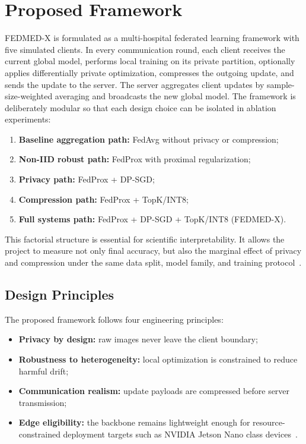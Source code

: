 \section{Proposed Framework}
FEDMED-X is formulated as a multi-hospital federated learning framework with
five simulated clients. In every communication round, each client receives
the current global model, performs local training on its private partition,
optionally applies differentially private optimization, compresses the
outgoing update, and sends the update to the server. The server aggregates
client updates by sample-size-weighted averaging and broadcasts the new
global model. The framework is deliberately modular so that each design
choice can be isolated in ablation experiments:
\begin{enumerate}[leftmargin=*]
  \item \textbf{Baseline aggregation path:} FedAvg without privacy or
        compression;
  \item \textbf{Non-IID robust path:} FedProx with proximal regularization;
  \item \textbf{Privacy path:} FedProx + DP-SGD;
  \item \textbf{Compression path:} FedProx + TopK/INT8;
  \item \textbf{Full systems path:} FedProx + DP-SGD + TopK/INT8 (FEDMED-X).
\end{enumerate}
This factorial structure is essential for scientific interpretability. It
allows the project to measure not only final accuracy, but also the marginal
effect of privacy and compression under the same data split, model family,
and training protocol~\cite{zhou2025federated}.

\subsection{Design Principles}
The proposed framework follows four engineering principles:
\begin{itemize}[leftmargin=*]
  \item \textbf{Privacy by design:} raw images never leave the client
        boundary;
  \item \textbf{Robustness to heterogeneity:} local optimization is
        constrained to reduce harmful drift;
  \item \textbf{Communication realism:} update payloads are compressed
        before server transmission;
  \item \textbf{Edge eligibility:} the backbone remains lightweight enough
        for resource-constrained deployment targets such as NVIDIA Jetson
        Nano class devices~\cite{shabarinath2025efficacy}.
\end{itemize}

